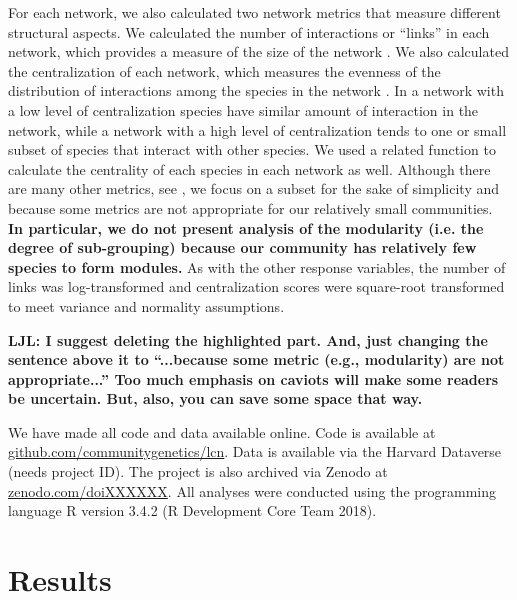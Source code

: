 \documentclass[9pt,twocolumn,twoside,lineno]{pnas-new}
\begin{document}
{For each network, we also calculated two network metrics that measure
different structural aspects. We calculated the number of interactions
or ``links'' in each network, which provides a measure of the size of
the network \citep{Lau2015, Borrett2015}. We also calculated the
centralization of each network, which measures the evenness of the
distribution of interactions among the species in the network
\cite{Butts2005}. In a network with a low level of centralization
species have similar amount of interaction in the network, while a
network with a high level of centralization tends to one or small
subset of species that interact with other species. We used a related
function to calculate the centrality of each species in each network
as well. Although there are many other metrics, see \citep{Lau2017a},
we focus on a subset for the sake of simplicity and because some
metrics are not appropriate for our relatively small
communities. \textbf{In particular, we do not present analysis of the
  modularity (i.e. the degree of sub-grouping) because our community
  has relatively few species to form modules.} As with the other
response variables, the number of links was log-transformed and
centralization scores were square-root transformed to meet variance
and normality assumptions.

\textbf{LJL: I suggest deleting the highlighted part. And, just
  changing the sentence above it to “...because some metric (e.g.,
  modularity) are not appropriate...”  Too much emphasis on caviots
  will make some readers be uncertain. But, also, you can save some
  space that way.}

We have made all code and data available online. Code is available at
\url{github.com/communitygenetics/lcn}. Data is available via the
Harvard Dataverse (needs project ID). The project is also archived via
Zenodo at \url{zenodo.com/doiXXXXXX}. All analyses were conducted
using the programming language R version 3.4.2 (R Development Core
Team 2018).

\section*{Results}





}
\end{document}
